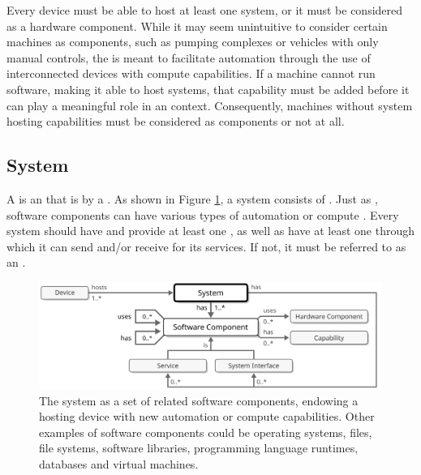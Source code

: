 Every device must be able to host at least one system, or it must be considered as a hardware component.
While it may seem unintuitive to consider certain machines as components, such as pumping complexes or vehicles with only manual controls, the  is meant to facilitate automation through the use of interconnected devices with compute capabilities.
If a machine cannot run software, making it able to host systems, that capability must be added before it can play a meaningful role in an  context.
Consequently, machines without system hosting capabilities must be considered as components or not at all.

\subsection{System}
\label{sec:concepts:system}

A  is an   that is  by a .
As shown in Figure \ref{fig:system}, a system consists of .
Just as , software components can have various types of automation or compute .
Every system should have and provide at least one , as well as have at least one  through which it can send and/or receive  for its services.
If not, it must be referred to as an .

\vspace*{-1mm}

\begin{figure}[ht!]
  \centering
  \includegraphics[scale=0.9]{figures/system}
  \caption{
    The system as a set of related software components, endowing a hosting device with new automation or compute capabilities.
    Other examples of software components could be operating systems, files, file systems, software libraries, programming language runtimes, databases and virtual machines.
  }
  \label{fig:system}
\end{figure}

